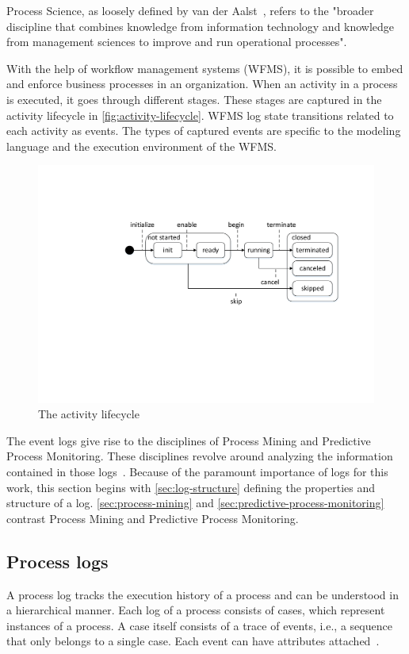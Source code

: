Process Science, as loosely defined by van der Aalst~\cite{Aalst2016}, refers to the "broader discipline that combines knowledge from information technology and knowledge from management sciences to improve and run operational processes".

With the help of workflow management systems (WFMS), it is possible to embed and enforce business processes in an organization. When an activity in a process is executed, it goes through different stages. These stages are captured in the activity lifecycle in \autoref{fig:activity-lifecycle}. WFMS log state transitions related to each activity as events. The types of captured events are specific to the modeling language and the execution environment of the WFMS.

\begin{figure}[!htb]
    \centering
    \includegraphics[width=.9\textwidth]{gfx/activityLifeCycle.pdf}
    \caption{The activity lifecycle}
    \label{fig:activity-lifecycle}
\end{figure}

The event logs give rise to the disciplines of Process Mining and Predictive Process Monitoring. These disciplines revolve around analyzing the information contained in those logs~\cite{Aalst2016}. Because of the paramount importance of logs for this work, this section begins with \autoref{sec:log-structure} defining the properties and structure of a log. \autoref{sec:process-mining} and \autoref{sec:predictive-process-monitoring} contrast Process Mining and Predictive Process Monitoring.

\subsection{Process logs}\label{sec:log-structure}
A process log tracks the execution history of a process and can be understood in a hierarchical manner. Each log of a process consists of cases, which represent instances of a process. A case itself consists of a trace of events, i.e., a sequence that only belongs to a single case. Each event can have attributes attached~\cite{Aalst2016}.

